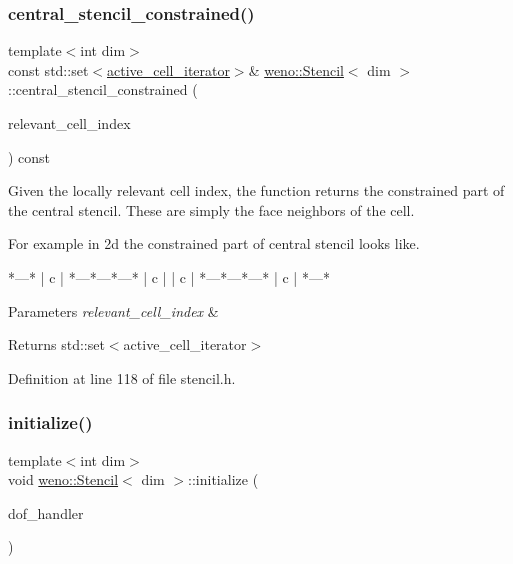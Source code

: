 \subsubsection{\texorpdfstring{central\+\_\+stencil\+\_\+constrained()}{central\_stencil\_constrained()}}
{\footnotesize\ttfamily template$<$int dim$>$ \\
const std\+::set$<$\hyperlink{classweno_1_1_stencil_a5a730ad61bd5e9c36a86ccb36578f42c}{active\+\_\+cell\+\_\+iterator}$>$\& \hyperlink{classweno_1_1_stencil}{weno\+::\+Stencil}$<$ dim $>$\+::central\+\_\+stencil\+\_\+constrained (\begin{DoxyParamCaption}\item[{unsigned int}]{relevant\+\_\+cell\+\_\+index }\end{DoxyParamCaption}) const\hspace{0.3cm}{\ttfamily [inline]}}



Given the locally relevant cell index, the function returns the constrained part of the central stencil. These are simply the face neighbors of the cell. 

For example in 2d the constrained part of central stencil looks like.

\begin{DoxyVerb}     *---*
     | c |
 *---*---*---*
 | c |   | c |
 *---*---*---*
     | c |
     *---*
\end{DoxyVerb}



\begin{DoxyParams}{Parameters}
{\em relevant\+\_\+cell\+\_\+index} & \\
\hline
\end{DoxyParams}
\begin{DoxyReturn}{Returns}
std\+::set$<$active\+\_\+cell\+\_\+iterator$>$ 
\end{DoxyReturn}


Definition at line 118 of file stencil.\+h.

\mbox{\label{classweno_1_1_stencil_a765c64da48da663c23b80f397386f9f9}} 
\subsubsection{\texorpdfstring{initialize()}{initialize()}}
{\footnotesize\ttfamily template$<$int dim$>$ \\
void \hyperlink{classweno_1_1_stencil}{weno\+::\+Stencil}$<$ dim $>$\+::initialize (\begin{DoxyParamCaption}\item[{const dealii\+::\+Do\+F\+Handler$<$ dim $>$ \&}]{dof\+\_\+handler }\end{DoxyParamCaption})}



